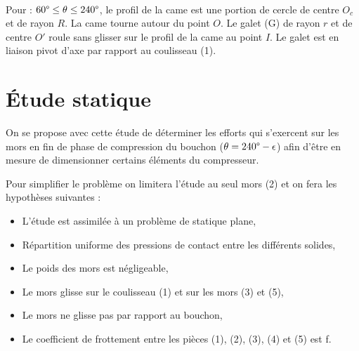 
~\

Pour : $60\degree \leq \theta \leq 240\degree$, le profil de la came est une portion de cercle de centre $O_c$ et de rayon $R$. La came tourne autour du point $O$. Le galet (G) de rayon $r$ et de centre $O'$ roule sans glisser sur le profil de la came au point $I$. Le galet est en liaison pivot d'axe  par rapport au coulisseau (1).


\section{Étude statique}

On se propose avec cette étude de déterminer les efforts qui s'exercent sur les mors en fin de phase de compression du bouchon ($\theta= 240\degree - \epsilon$) afin d'être en mesure de dimensionner certains éléments du compresseur.

Pour simplifier le problème on limitera l'étude au seul mors (2) et on fera les hypothèses suivantes :
\begin{itemize}
 \item L'étude est assimilée à un problème de statique plane,
 \item Répartition uniforme des pressions de contact entre les différents solides,
 \item Le poids des mors est négligeable,
 \item Le mors glisse sur le coulisseau (1) et sur les mors (3) et (5),
 \item Le mors ne glisse pas par rapport au bouchon,
 \item Le coefficient de frottement entre les pièces (1), (2), (3), (4) et (5) est f.
\end{itemize}


